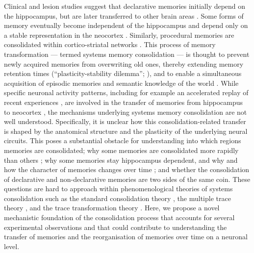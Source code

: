 
Clinical and lesion studies suggest that declarative memories initially depend on the hippocampus, but are later transferred to other brain areas \cite{Dudai2015, Squire2015, Sekeres2017}. Some forms of memory eventually become independent of the hippocampus and depend only on a stable representation in the neocortex \cite{Dudai2015, Squire2015, Sekeres2017}. Similarly, procedural memories are consolidated within cortico-striatal networks \cite{Karni1994, Brashers-Krug1996, Dudai2015}.
This process of memory transformation --- termed systems memory consolidation --- is thought to prevent newly acquired memories from overwriting old ones, thereby extending memory retention times (``plasticity-stability dilemma''; \cite{Grossberg1987, Abraham2005, Fusi2005, Leibold2008, Roxin2013}), and to enable a simultaneous acquisition of episodic memories and semantic knowledge of the world \cite{McClelland1995, Kumaran2016}.
While specific neuronal activity patterns, including for example an accelerated replay of recent experiences \cite{Lee2002, Skaggs1996}, are involved in the transfer of memories from hippocampus to neocortex \cite{Diekelmann2010}, the mechanisms underlying systems memory consolidation are not well understood. Specifically, it is unclear how this consolidation-related transfer is shaped by the anatomical structure and the plasticity of the underlying neural circuits.
This poses a substantial obstacle for understanding into which regions memories are consolidated; why some memories are consolidated more rapidly than others \cite{Nadel1997, Tse2007, Brodt2018}; why some memories stay hippocampus dependent, and why and how the character of memories changes over time \cite{Dudai2015}; and whether the consolidation of declarative and non-declarative memories \cite{Karni1994, Brashers-Krug1996, Dudai2015} are two sides of the same coin. These questions are hard to approach within phenomenological theories of systems consolidation such as the standard consolidation theory \cite{Squire1995, McClelland1995}, the multiple trace theory \cite{Nadel1997}, and the trace transformation theory \cite{Winocur2010, Winocur2011}.
Here, we propose a novel mechanistic foundation of the consolidation process that accounts for several experimental observations and that could contribute to understanding the transfer of memories and the reorganisation of memories over time on a neuronal level.



